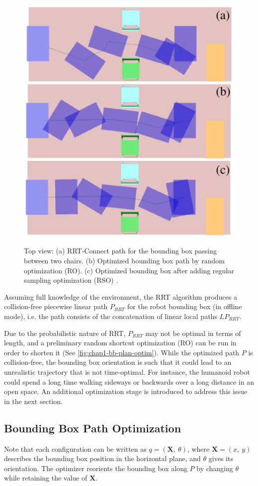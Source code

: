 \begin{figure}
  \centering
      {\includegraphics[width = 0.8\linewidth]
        {src/chap1-path-optimization/bb-plan-optim.pdf}}
      \caption{Top view: (a) RRT-Connect path for the bounding box
        passing between two chairs. (b) Optimized bounding box path by
        random optimization (RO). (c) Optimized bounding box after
        adding regular sampling optimization (RSO) .}
      \label{fig:chap1-bb-plan-optim}
\end{figure}

Assuming full knowledge of the environment, the RRT
algorithm produces a collision-free piecewise linear path $P_{RRT}$
for the robot bounding box (in offline mode), i.e. the path consists
of the concatenation of linear local paths $LP_{RRT}$.

Due to the probabilistic nature of RRT, $P_{RRT}$ may not be optimal
in terms of length, and a preliminary random shortcut optimization
(RO) can be run in order to shorten it (See
\autoref{fig:chap1-bb-plan-optim}). While the optimized path $P$ is
collision-free, the bounding box orientation is such that it could
lead to an unrealistic trajectory that is not time-optimal. For
instance, the humanoid robot could spend a long time walking sideways
or backwards over a long distance in an open space. An additional
optimization stage is introduced to address this issue in the next
section.

\subsection{Bounding Box Path Optimization}
Note that each configuration \config{} can be written as $q =
(\mathbf{X},~\theta)$, where $\mathbf{X} = (x,~y)$ describes the
bounding box position in the horizontal plane, and $\theta$ gives its
orientation.  The optimizer reorients the bounding box along $P$ by
changing $\theta$ while retaining the value of $\mathbf{X}$.

